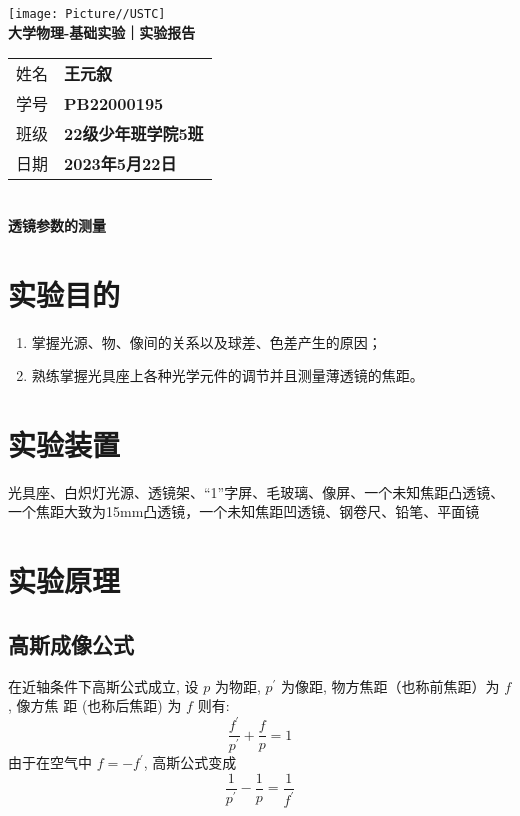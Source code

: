 \documentclass[10pt,a4paper]{article}	%
\newcommand{\nexp}{透镜参数的测量}
\begin{document}
	\vspace*{-5em}
	\begin{center}
		\texttt{[image: Picture//USTC]}\\
		\Large \textbf{大学物理-基础实验｜实验报告}\\[5mm]

		\normalsize
		\begin{tabular}{ll}
			姓名 & \textbf{王元叙}\\
			学号 & \textbf{PB22000195}\\
			班级 & \textbf{22级少年班学院5班}\\
			日期 & \textbf{2023年5月22日}\\	
		\end{tabular}\\[5mm]

		\LARGE \textbf{\nexp}\\[5mm]	

	\end{center}

	\section{实验目的}

	\begin{enumerate}
		\item 掌握光源、物、像间的关系以及球差、色差产生的原因；
		\item 熟练掌握光具座上各种光学元件的调节并且测量薄透镜的焦距。
	\end{enumerate}


	\section{实验装置}
	光具座、白炽灯光源、透镜架、“1”字屏、毛玻璃、像屏、一个未知焦距凸透镜、一个焦距大致为15mm凸透镜，一个未知焦距凹透镜、钢卷尺、铅笔、平面镜

	\section{实验原理}
	\subsection{高斯成像公式}
	在近轴条件下高斯公式成立, 设 $p$ 为物距, $p^{\prime}$ 为像距, 物方焦距（也称前焦距）为 $f$, 像方焦 距 (也称后焦距) 为 $f$ 则有:
	\[
		\frac{f^{\prime}}{p^{\prime}}+\frac{f}{p}=1 \tag{1}
	\]
	由于在空气中 $f=-f^{\prime}$, 高斯公式变成
	\[
		\frac{1}{p^{\prime}}-\frac{1}{p}=\frac{1}{f^{\prime}} \tag{2}
	\]
\end{document}
